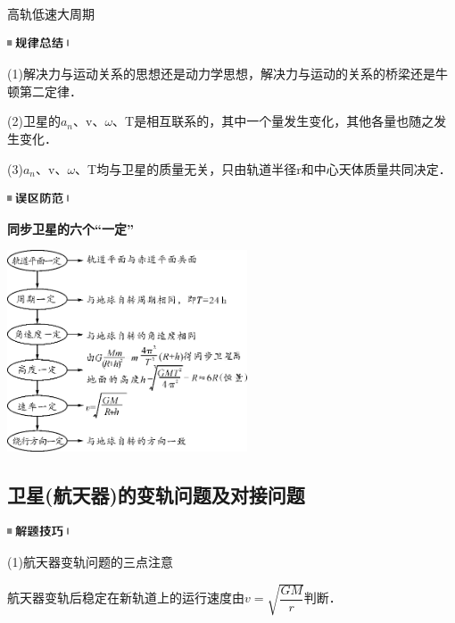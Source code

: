 \documentclass[cn,10.5pt,chinese,mac,chinesefont=founder]{elegantbook}
\begin{document}
高轨低速大周期

\begin{center}\includegraphics[width=0.71667in,height=0.13333in]{media/image44.png}\end{center}

(1)解决力与运动关系的思想还是动力学思想，解决力与运动的关系的桥梁还是牛顿第二定律．

(2)卫星的$a_n$、v、$\omega$、T是相互联系的，其中一个量发生变化，其他各量也随之发生变化．

(3)$a_n$、v、$\omega$、T均与卫星的质量无关，只由轨道半径r和中心天体质量共同决定．

\begin{center}\includegraphics[width=0.71667in,height=0.13333in]{media/image34.png}

\textbf{同步卫星的六个``一定''}
\end{center}


\begin{center}\includegraphics[width=2.8in,height=2.35in]{media/image201.png}\end{center}
\newpage
\subsection{卫星(航天器)的变轨问题及对接问题}

\begin{center}\includegraphics[width=0.71667in,height=0.13333in]{media/image37.png}\end{center}

(1)航天器变轨问题的三点注意

航天器变轨后稳定在新轨道上的运行速度由$v=\sqrt{\dfrac{G M}{r}}$判断．
\end{document}
